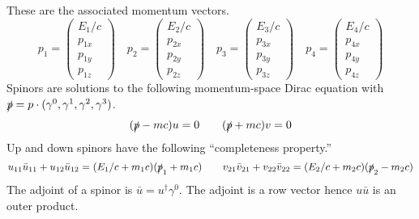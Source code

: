 \documentclass[12pt]{article}
\begin{document}
\noindent
These are the associated momentum vectors.
$$
p_1=\begin{pmatrix}E_1/c\\p_{1x}\\p_{1y}\\p_{1z}\end{pmatrix}\quad
p_2=\begin{pmatrix}E_2/c\\p_{2x}\\p_{2y}\\p_{2z}\end{pmatrix}\quad
p_3=\begin{pmatrix}E_3/c\\p_{3x}\\p_{3y}\\p_{3z}\end{pmatrix}\quad
p_4=\begin{pmatrix}E_4/c\\p_{4x}\\p_{4y}\\p_{4z}\end{pmatrix}
$$
Spinors are solutions to the following momentum-space Dirac equation with
$\slashed{p}=p\cdot(\gamma^0,\gamma^1,\gamma^2,\gamma^3)$.
$$
(\slashed{p}-mc)u=0\qquad(\slashed{p}+mc)v=0
$$
Up and down spinors have the following ``completeness property.''
$$
u_{11}\bar{u}_{11}+u_{12}\bar{u}_{12}=(E_1/c+m_1c)(\slashed{p}_1+m_1c)\qquad
v_{21}\bar{v}_{21}+v_{22}\bar{v}_{22}=(E_2/c+m_2c)(\slashed{p}_2-m_2c)
$$
The adjoint of a spinor is $\bar{u}=u^\dag\gamma^0$.
The adjoint is a row vector hence $u\bar{u}$ is an outer product.
\end{document}
